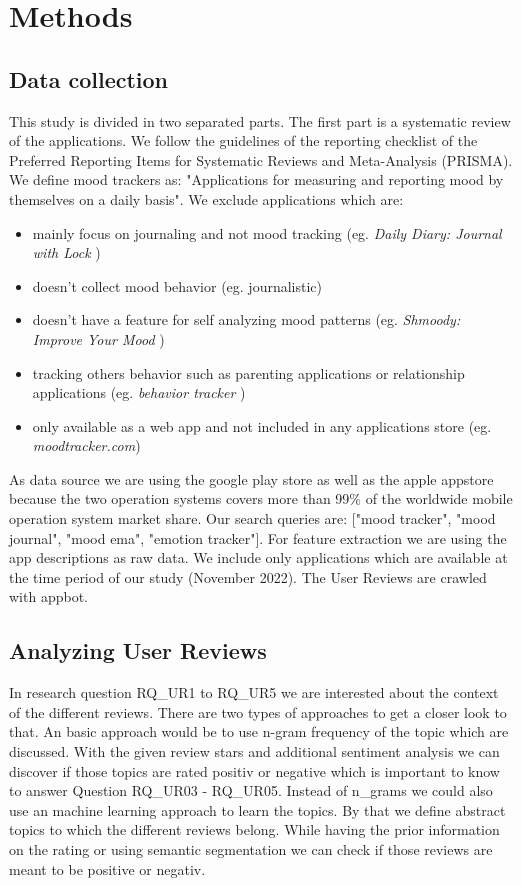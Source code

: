 \chapter{Methods}
\section{Data collection}
This study is divided in two separated parts. The first part is a systematic review of the applications. We follow the guidelines of the reporting checklist of the Preferred Reporting Items for Systematic Reviews and Meta-Analysis (PRISMA\cite{moher2015preferred}). 
We define mood trackers as:
"Applications for measuring and reporting mood by themselves on a daily basis".
We exclude applications which are:
\begin{itemize}
    \item mainly focus on journaling and not mood tracking (eg. \textit{Daily Diary: Journal with Lock} \cite{simpleinnovation_2022})
    \item doesn't collect mood behavior (eg. journalistic\cite{engelhardt_2020})
    \item doesn't have a feature for self analyzing mood patterns (eg. \textit{Shmoody: Improve Your Mood} \cite{shmoody})
    \item tracking others behavior such as parenting applications or relationship applications (eg. \textit{behavior tracker} \cite{skycap_2020})
    \item only available as a web app and not included in any applications store (eg. \textit{moodtracker.com}\cite{moodtrackercom})
\end{itemize}
As data source we are using the google play store\cite{google} as well as the apple appstore because the two operation systems covers more than 99\% of the worldwide mobile operation system market share.
Our search queries are: ["mood tracker", "mood journal", "mood ema", "emotion tracker"].
For feature extraction we are using the app descriptions as raw data. We include only applications which are available at the time period of our study (November 2022). 
The User Reviews are crawled with appbot\cite{appbot}.

\section{Analyzing User Reviews}
In research question RQ\_UR1 to RQ\_UR5 we are interested about the context of the different reviews.
There are two types of approaches to get a closer look to that.
An basic approach would be to use n-gram frequency of the topic which are discussed. With the given review stars and additional sentiment analysis we can discover if those topics are rated positiv or negative which is important to know to answer Question RQ\_UR03 - RQ\_UR05. 
Instead of n\_grams we could also use an machine learning approach to learn the topics.
By that we define abstract topics to which the different reviews belong.
While having the prior information on the rating or using semantic segmentation we can check if those reviews are meant to be positive or negativ.



